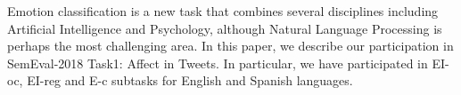 Emotion classification is a new task that combines several disciplines including Artificial Intelligence and Psychology, although Natural Language Processing is perhaps the most challenging area. In this paper, we describe our participation in SemEval-2018 Task1: Affect in Tweets. In particular, we have participated in EI-oc, EI-reg and E-c subtasks for English and Spanish languages.
